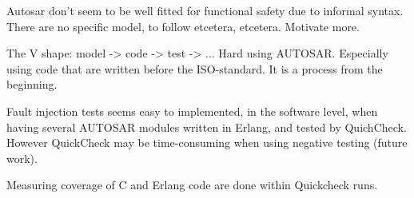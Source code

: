 Autosar don't seem to be well fitted for functional safety due to informal
syntax. There are no specific model, to follow etcetera, etcetera. Motivate
more.

The V shape: model -> code -> test -> ... Hard using AUTOSAR. Especially using
code that are written before the ISO-standard. It is a process from the
beginning.


Fault injection tests seems easy to implemented, in the software level, when having several AUTOSAR
modules written in Erlang, and tested by QuichCheck. However QuickCheck may be
time-consuming when using negative testing (future work).

Measuring coverage of C and Erlang code are done within Quickcheck runs.
